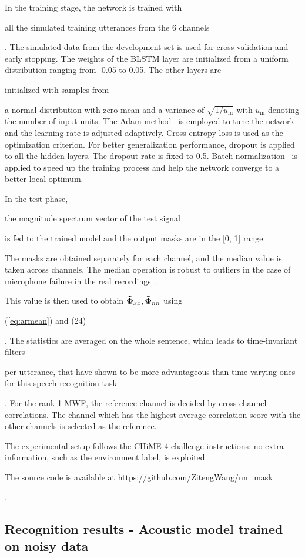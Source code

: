 \documentclass[review]{elsarticle}
\newif\ifproofread
\newcommand{\pfmarker}[1]{%
\ifproofread
\textcolor{red}{#1}%
\else
#1%
\fi
}
\newif\ifminorR
\newcommand{\pfminor}[1]{%
\ifminorR
\textcolor{red}{#1}%
\else
#1%
\fi
}
\begin{document}
In the training stage, the network is trained with \pfmarker{all the simulated training utterances from the 6 channels}. The simulated data from the development set is used for cross validation and early stopping. The weights of the BLSTM layer are initialized from a uniform distribution ranging from -0.05 to 0.05. The other layers are \pfmarker{initialized with samples from} a normal distribution with zero mean and a variance of $\sqrt{1/u_{\text{in}}}$ with $u_{\text{in}}$ denoting the number of input units. The Adam method~\cite{kingma2014adam} is employed to tune the network and the learning rate is adjusted adaptively. Cross-entropy loss is used as the optimization criterion. For better generalization performance, dropout is applied to all the hidden layers. The dropout rate is fixed to 0.5. Batch normalization~\cite{ioffe2015batch} is applied to speed up the training process and help the network converge to a better local optimum.

In the test phase, \pfmarker{the magnitude spectrum vector of the test signal} is fed to the trained model and the output masks are in the [0, 1] range. \pfmarker{The masks are obtained separately for each channel, and the median value is taken across channels. The median operation is robust to outliers in the case of microphone failure in the real recordings~\cite{2016icasspBLSTM}.} This value is then used to obtain ${\bf \tilde\Phi}_{xx}, {\bf \tilde\Phi}_{nn}$ using \pfminor{(\ref{eq:armean}) and (24)}. The statistics are averaged on the whole sentence, which leads to time-invariant filters \pfmarker{per utterance, that have shown to be more advantageous than time-varying ones for this speech recognition task~\cite{2016chime4}}. For the rank-1 MWF, the reference channel is decided by cross-channel correlations. The channel which has the highest average correlation score with the other channels is selected as the reference.

\pfminor{The experimental setup follows the CHiME-4 challenge instructions: no extra information, such as the environment label, is exploited.} \pfmarker{The source code is available at \url{https://github.com/ZitengWang/nn\_mask}}.

\subsection{Recognition results - Acoustic model trained on noisy data}
\end{document}
